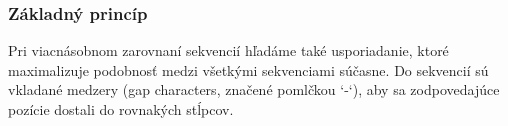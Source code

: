 \subsubsection{Základný princíp}
Pri viacnásobnom zarovnaní sekvencií hľadáme také usporiadanie, ktoré maximalizuje podobnosť medzi všetkými sekvenciami súčasne. Do sekvencií sú vkladané medzery (gap characters, značené pomlčkou `-`), aby sa zodpovedajúce pozície dostali do rovnakých stĺpcov.
